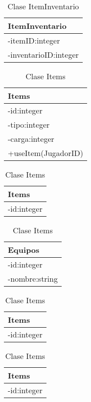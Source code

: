 \documentclass{article}
\begin{document}
\begin{table}
	\centering
	\begin{tabular}{|l|}
	\hline
		ItemInventario\\
	\hline
		-itemID:integer\\
		-inventarioID:integer\\
	  \hline
	\end{tabular}
	\caption{Clase ItemInventario}
	\label{tab:ItemInventario}
\end{table}
\begin{table}
	\centering
	\begin{tabular}{|l|}
	\hline
		Items\\
	\hline
		-id:integer\\
		-tipo:integer\\
		-carga:integer\\
		+useItem(JugadorID)\\
	  \hline
	\end{tabular}
	\caption{Clase Items}
	\label{tab:Items}
\end{table}
\begin{table}
	\centering
	\begin{tabular}{|l|}
	\hline
		Items\\
	\hline
		-id:integer\\
	  \hline
	\end{tabular}
	\caption{Clase Items}
	\label{tab:Items}
\end{table}
\begin{table}
	\centering
	\begin{tabular}{|l|}
	\hline
		Equipos\\
	\hline
		-id:integer\\
		-nombre:string\\
	  \hline
	\end{tabular}
	\caption{Clase Items}
	\label{tab:Items}
\end{table}
\begin{table}
	\centering
	\begin{tabular}{|l|}
	\hline
		Items\\
	\hline
		-id:integer\\
	  \hline
	\end{tabular}
	\caption{Clase Items}
	\label{tab:Items}
\end{table}
\begin{table}
	\centering
	\begin{tabular}{|l|}
	\hline
		Items\\
	\hline
		-id:integer\\
	  \hline
	\end{tabular}
	\caption{Clase Items}
	\label{tab:Items}
\end{table}
\end{document}
